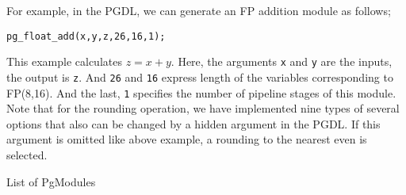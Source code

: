 \documentclass{llncs}
\begin{document}
For example, in the PGDL, we can generate an FP addition module
as follows;
\begin{verbatim}
pg_float_add(x,y,z,26,16,1);
\end{verbatim}
This example calculates $z = x + y$. 
Here, the arguments \verb|x| and \verb|y| are the inputs, the output is \verb|z|.
And \verb|26| and \verb|16| express length of the variables corresponding to FP(8,16).
And the last, \verb|1| specifies the number of pipeline stages of this module.
Note that for the rounding operation, we have implemented nine types
of several options that also can be changed by a hidden argument in the PGDL.
If this argument is omitted like above example, a rounding to the nearest even is selected.

\begin{table}
  \begin{center}
    \caption{List of PgModules}


\end{center}
\end{table}
\end{document}
